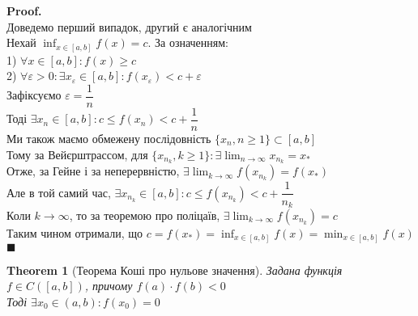 \documentclass[a4paper, 14pt]{extarticle}
\def\huge{\displaystyle}
\theoremstyle{theoremdd}
\newtheorem{theorem}{Theorem}[subsection]
\theoremstyle{theoremdd}
\theoremstyle{theoremdd}
\theoremstyle{theoremdd}
\theoremstyle{theoremdd}
\theoremstyle{theoremdd}
\theoremstyle{theoremdd}
\theoremstyle{theoremdd}
\newenvironment{pf}{\vspace*{-3mm} \textbf{Proof. \\}}{$\blacksquare$}
\begin{document}
\begin{pf}
Доведемо перший випадок, другий є аналогічним\\
Нехай $\huge \inf_{x \in [a,b]} f(x) = c$. За означенням:\\
1) $\forall x \in [a,b]: f(x) \geq c$\\
2) $\forall \varepsilon > 0: \exists x_{\varepsilon} \in [a,b]: f(x_{\varepsilon}) < c + \varepsilon$\\
Зафіксуємо $\varepsilon = \dfrac{1}{n}$\\
Тоді $\exists x_n \in [a,b]: c \leq f(x_n) < c + \dfrac{1}{n}$\\
Ми також маємо обмежену послідовність $\{x_n, n \geq 1\} \subset [a,b]$\\
Тому за Вейєрштрассом, для $\{x_{n_k},k \geq 1\}: \exists \huge \lim_{n \to \infty} x_{n_k} = x_*$\\
Отже, за Гейне і за неперервністю, $\huge \exists \lim_{k \to \infty} f(x_{n_k}) = f(x_*)$\\
Але в той самий час, $\exists x_{n_k} \in [a,b]: c \leq f(x_{n_k}) < c + \dfrac{1}{n_k}$\\
Коли $k \to \infty$, то за теоремою про поліцаїв, $\exists \huge \lim_{k \to \infty} f(x_{n_k}) = c$\\
Таким чином отримали, що $c = f(x_*) = \huge \inf_{x \in [a,b]} f(x) = \min_{x \in [a,b]} f(x)$
\end{pf}

\begin{theorem}[Теорема Коші про нульове значення]
Задана функція $f \in C([a,b])$, причому $f(a) \cdot f(b) < 0$\\
Тоді $\exists x_0 \in (a,b): f(x_0) = 0$
\end{theorem}
\end{document}
